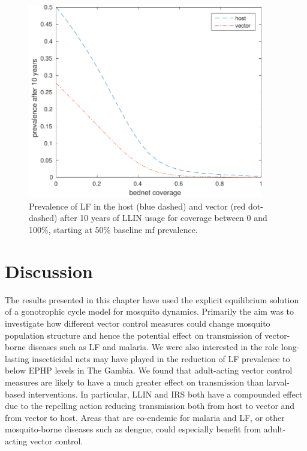 \begin{figure}[!ht]
\begin{center}
\includegraphics[height=8.5cm]{Project/Figures/VectorModel/LF/10yearprev_1950s_bednets.pdf} 
\caption[LLIN impact over 10 years (LF).]{Prevalence of LF in the host (blue dashed) and vector (red dot-dashed) after 10 years of LLIN usage for coverage between 0 and 100\%, starting at 50\% baseline mf prevalence.}
\label{fig:10yrLLIN}
\end{center}
\end{figure} 

\FloatBarrier

\section{Discussion}

The results presented in this chapter have used the explicit equilibrium solution of a gonotrophic cycle model for mosquito dynamics. Primarily the aim was to investigate how different vector control measures could change mosquito population structure and hence the potential effect on transmission of vector-borne diseases such as LF and malaria. We were also interested in the role long-lasting insecticidal nets may have played in the reduction of LF prevalence to below EPHP levels in The Gambia. We found that adult-acting vector control measures are likely to have a much greater effect on transmission than larval-based interventions. In particular, LLIN and IRS both have a compounded effect due to the repelling action reducing transmission both from host to vector and from vector to host. Areas that are co-endemic for malaria and LF, or other mosquito-borne diseases such as dengue, could especially benefit from adult-acting vector control. 

